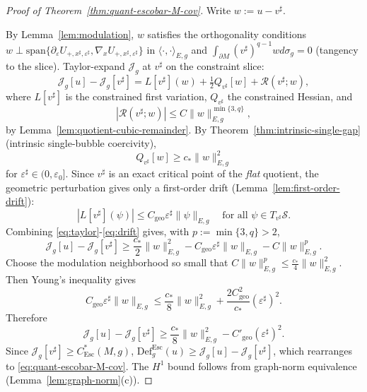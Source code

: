 \documentclass[11pt,reqno,a4paper]{amsart}
\numberwithin{equation}{section}
\newcommand{\Def}{\mathrm{Def}}
\theoremstyle{plain}
\theoremstyle{remark}
\theoremstyle{plain}
\begin{document}
\begin{proof}[Proof of Theorem~\ref{thm:quant-escobar-M-cov}]
Write $w:=u-v^\sharp$.

By Lemma~\ref{lem:modulation}, $w$ satisfies the orthogonality conditions $w\perp\mathrm{span}\{\partial_\varepsilon U_{+,x^\sharp,\varepsilon^\sharp},\nabla_x U_{+,x^\sharp,\varepsilon^\sharp}\}$ in $\langle\cdot,\cdot\rangle_{E,g}$
and $\int_{\partial M}(v^\sharp)^{q-1}wd\sigma_g=0$ (tangency to the slice).
Taylor-expand $\mathcal J_g$ at $v^\sharp$ on the constraint slice:
\begin{equation}\label{eq:taylor}
\mathcal J_g[u]-\mathcal J_g[v^\sharp]
= L[v^\sharp](w)
+ \tfrac12Q_{v^\sharp}[w]
+ \mathcal R(v^\sharp;w),
\end{equation}
where $L[v^\sharp]$ is the constrained first variation, $Q_{v^\sharp}$ the constrained Hessian, and
\begin{equation}\label{eq:cubic-remainder}
|\mathcal R(v^\sharp;w)|\le C\|w\|_{E,g}^{\min\{3,q\}},
\end{equation}
by Lemma~\ref{lem:quotient-cubic-remainder}.
By Theorem~\ref{thm:intrinsic-single-gap} (intrinsic single-bubble coercivity),
\begin{equation}\label{eq:Q-coercive}
Q_{v^\sharp}[w]\ge c_\ast\|w\|_{E,g}^2
\end{equation}
for $\varepsilon^\sharp\in(0,\varepsilon_0]$.
Since $v^\sharp$ is an exact critical point of the \emph{flat} quotient, the geometric
perturbation gives only a first-order drift (Lemma~\ref{lem:first-order-drift}):
\begin{equation}\label{eq:drift}
|L[v^\sharp](\psi)|\le C_{\mathrm{geo}}\varepsilon^\sharp\|\psi\|_{E,g}
\quad\text{for all }\psi\in T_{v^\sharp}\mathcal S.
\end{equation}
Combining \eqref{eq:taylor}-\eqref{eq:drift} gives, with
$p:=\min\{3,q\}>2$,
\[
\mathcal J_g[u]-\mathcal J_g[v^\sharp]
\ge
\frac{c_\ast}{2}\|w\|_{E,g}^2
-C_{\mathrm{geo}}\varepsilon^\sharp\|w\|_{E,g}
-C\|w\|_{E,g}^{p}.
\]
Choose the modulation neighborhood so small that
$C\|w\|_{E,g}^{p}\le \frac{c_\ast}{4}\|w\|_{E,g}^2$.  Then Young's inequality gives
\[
C_{\mathrm{geo}}\varepsilon^\sharp\|w\|_{E,g}
\le
\frac{c_\ast}{8}\|w\|_{E,g}^2
+\frac{2C_{\mathrm{geo}}^2}{c_\ast}(\varepsilon^\sharp)^2.
\]
Therefore
\begin{equation}\label{eq:gap-lower}
\mathcal J_g[u]-\mathcal J_g[v^\sharp]
\ge
\frac{c_\ast}{8}\|w\|_{E,g}^2
-C'_{\mathrm{geo}}(\varepsilon^\sharp)^2.
\end{equation}
Since $\mathcal J_g[v^\sharp]\ge C^*_{\mathrm{Esc}}(M,g)$,
$\Def^{\mathrm{Esc}}_g(u)\ge\mathcal J_g[u]-\mathcal J_g[v^\sharp]$,
which rearranges to \eqref{eq:quant-escobar-M-cov}.
The $H^1$ bound follows from graph-norm equivalence (Lemma~\ref{lem:graph-norm}(c)).
\end{proof}
\end{document}
